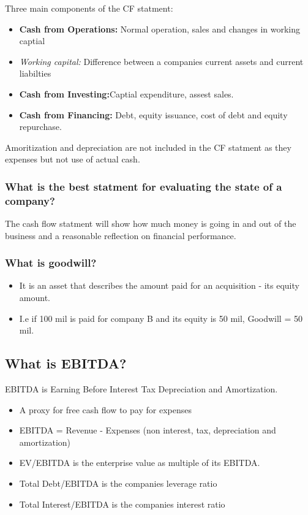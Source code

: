 \documentclass[11pt]{scrartcl} %
\begin{document}
Three main components of the CF statment:

\begin{itemize}
	\item \textbf{Cash from Operations:} Normal operation, sales and changes in working captial
	\item \textit{Working capital:} Difference between a companies current assets and current liabilties
	\item \textbf{Cash from Investing:}Captial expenditure, assest sales. 
	\item \textbf{Cash from Financing:} Debt, equity issuance, cost of debt and equity repurchase.
\end{itemize}

Amoritization and depreciation are not included in the CF statment as they expenses but not use of actual cash.

\subsubsection{What is the best statment for evaluating the state of a company?}

The cash flow statment will show how much money is going in and out of the business and a reasonable reflection on financial performance.

\subsubsection{What is goodwill?}

\begin{itemize}
	\item It is an asset that describes the amount paid for an acquisition - its equity amount.
	\item I.e if 100 mil is paid for company B and its equity is 50 mil, Goodwill = 50 mil.
\end{itemize}

\subsection{What is EBITDA?}

EBITDA is Earning Before Interest Tax Depreciation and Amortization. 

\begin{itemize}
	\item A proxy for free cash flow to pay for expenses
	\item EBITDA = Revenue - Expenses (non interest, tax, depreciation and amortization)
	\item EV/EBITDA is the enterprise value as multiple of its EBITDA.
	\item Total Debt/EBITDA is the companies leverage ratio
	\item Total Interest/EBITDA is the companies interest ratio
\end{itemize}
\end{document}
